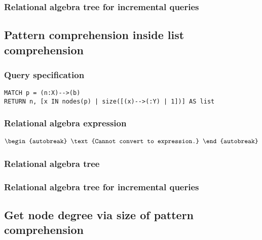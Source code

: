 \subsubsection*{Relational algebra tree for incremental queries}


\subsection{Pattern comprehension inside list comprehension}

\subsubsection*{Query specification}

\begin{lstlisting}
MATCH p = (n:X)-->(b)
RETURN n, [x IN nodes(p) | size([(x)-->(:Y) | 1])] AS list
\end{lstlisting}

\subsubsection*{Relational algebra expression}

\begin{align*}
\begin{autobreak}
\text{Cannot convert to expression.}
\end{autobreak}
\end{align*}

\subsubsection*{Relational algebra tree}


\subsubsection*{Relational algebra tree for incremental queries}


\subsection{Get node degree via size of pattern comprehension}

